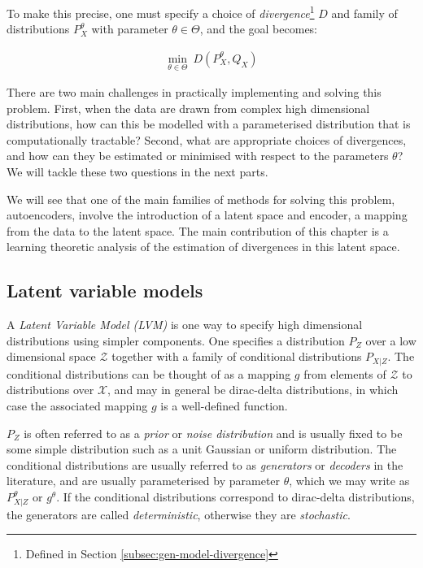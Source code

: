 To make this precise, one must specify a choice of \emph{divergence}\footnote{Defined in Section \ref{subsec:gen-model-divergence}} $D$ and family of distributions $P_X^\theta$ with parameter $\theta\in\Theta$, and the goal becomes:

\begin{align*}
\min_{\theta \in \Theta} \ D\left(P_X^\theta,  Q_X \right)
\end{align*}

There are two main challenges in practically implementing and solving this problem.
First, when the data are drawn from complex high dimensional distributions, how can this be modelled with a parameterised distribution that is computationally tractable?
Second, what are appropriate choices of divergences, and how can they be estimated or minimised with respect to the parameters $\theta$?
We will tackle these two questions in the next parts. 

We will see that one of the main families of methods for solving this problem, autoencoders, involve the introduction of a latent space and encoder, a mapping from the data to the latent space.
The main contribution of this chapter is a learning theoretic analysis of the estimation of divergences in this latent space. 

\subsection{Latent variable models}

A \emph{Latent Variable Model (LVM)} is one way to specify high dimensional distributions using simpler components. 
One specifies a distribution $P_Z$ over a low dimensional space $\mathcal{Z}$ together with a family of conditional distributions $P_{X|Z}$. 
The conditional distributions can be thought of as a mapping $g$ from elements of $\mathcal{Z}$ to distributions over $\mathcal{X}$,
and may in general be dirac-delta distributions, in which case the associated mapping $g$ is a well-defined function. 

$P_Z$ is often referred to as a \emph{prior} or \emph{noise distribution} and is usually fixed to be some simple distribution such as a unit Gaussian or uniform distribution. 
The conditional distributions are usually referred to as \emph{generators} or \emph{decoders} in the literature, and are usually parameterised by parameter $\theta$, which we may write as $P_{X|Z}^\theta$ or $g^\theta$. 
If the conditional distributions correspond to dirac-delta distributions, the generators are called \emph{deterministic}, otherwise they are \emph{stochastic}.

